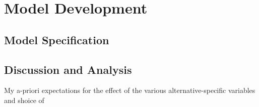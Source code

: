 \section{Model Development}
\subsection{Model Specification}
\subsection{Discussion and Analysis}
My a-priori expectations for the effect of the various alternative-specific variables and shoice of 